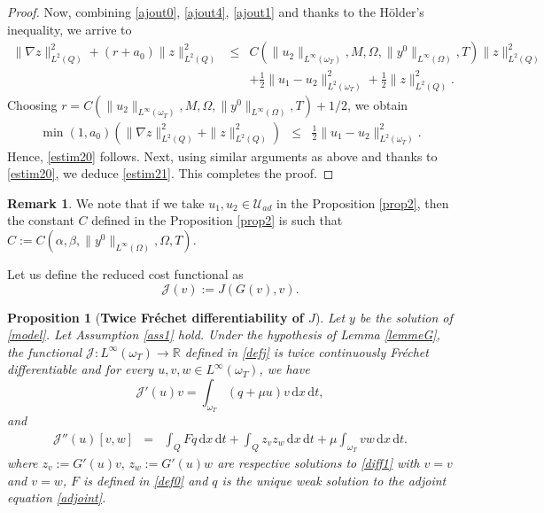 \documentclass[reqno,twoside]{amsart}
\numberwithin{equation}{section}
\newtheorem{proposition}[theorem]{Proposition}
\theoremstyle{definition}
\newtheorem{remark}[theorem]{Remark}
\numberwithin{equation}{section}
\def \dis {\displaystyle}
\def \R {\mathbb{R}}
\def \dq {\mathrm{d}x \, \mathrm{d}t}
\def \R {\mathbb{R}}
\begin{document}
\begin{proof}
Now, combining \eqref{ajout0}, \eqref{ajout4}, \eqref{ajout1} and thanks to the H\"{o}lder's inequality, we arrive to
\begin{equation}\label{ajout2}
	\begin{array}{rllll}
		\|\nabla z\|^2_{L^2(Q)}+ (r+a_0)\|z\|^2_{L^2(Q)} &\leq& C(\|u_2\|_{L^\infty(\omega_T)},M,\Omega, \|y^0\|_{L^\infty(\Omega)},T)\|z\|^2_{L^2(Q)}\\
		&&\dis + \frac{1}{2}\|u_1-u_2\|^2_{L^2(\omega_T)}+\frac{1}{2} \|z\|^2_{L^2(Q)}.
	\end{array}
\end{equation}
Choosing $\dis r=C(\|u_2\|_{L^\infty(\omega_T)},M,\Omega, \|y^0\|_{L^\infty(\Omega)},T)+1/2$, we obtain
\begin{equation}\label{ajout3}
	\begin{array}{rllll}
		\min(1,a_0)\left(\|\nabla z\|^2_{L^2(Q)}+ \|z\|^2_{L^2(Q)}\right) &\leq&\dis   \frac{1}{2}\|u_1-u_2\|^2_{L^2(\omega_T)}.
	\end{array}
\end{equation}
Hence, \eqref{estim20} follows. Next, using similar arguments as above and thanks to \eqref{estim20}, we deduce \eqref{estim21}. This completes the proof.
\end{proof}
\begin{remark}
We note that if we take $u_1,u_2\in \mathcal{U}_{ad}$ in the Proposition \ref{prop2}, then the constant $C$ defined in the Proposition \ref{prop2} is such that $C:=C(\alpha,\beta,\|y^0\|_{L^\infty(\Omega)},\Omega,T)$.
\end{remark}
Let us define the reduced cost functional as
\begin{equation}\label{defj}
\mathcal{J}(v):=J(G(v),v).
\end{equation}
\begin{proposition}[\bf Twice Fr\'echet differentiability of $J$]\label{diff4}
Let $y$ be the solution of \eqref{model}. Let Assumption \ref{ass1} hold. Under the hypothesis of Lemma \ref{lemmeG}, the functional $\mathcal{J}:L^\infty(\omega_T)\to \R$ defined in \eqref{defj} is twice continuously Fr\'echet differentiable and for every $u, v,w\in L^\infty(\omega_T)$, we have
\begin{equation}\label{diff5}
	\mathcal{J}'(u)v=\int_{\omega_T}\left( q+\mu u\right)v\,\dq,
\end{equation}
and
\begin{equation}\label{diff6}
	\left.
	\begin{array}{lllll}
		\mathcal{J}''(u)[v,w] &=&\dis \int_{Q}Fq\,\dq+ \int_{Q} z_vz_w\,\dq + \mu \int_{\omega_T}vw\,\dq.
	\end{array}
	\right.
\end{equation}	
where $z_{v}:=G'(u)v,\, z_{w}:=G'(u)w$ are respective solutions to \eqref{diff1} with $v=v$ and $v=w$, $F$ is defined in \eqref{def0} and $q$ is the unique weak solution to the adjoint equation \eqref{adjoint}.
\end{proposition}
\end{document}
